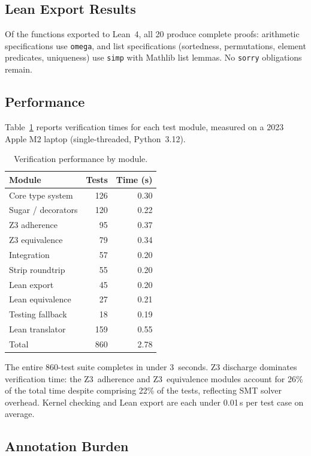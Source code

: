 \documentclass[acmsmall,nonacm,screen]{acmart}
\begin{document}
\subsection{Lean Export Results}

Of the functions exported to Lean~4, all 20 produce complete proofs:
arithmetic specifications use \texttt{omega}, and list specifications
(sortedness, permutations, element predicates, uniqueness) use
\texttt{simp} with Mathlib list lemmas.  No \texttt{sorry}
obligations remain.

\subsection{Performance}

Table~\ref{tab:perf} reports verification times for each test module,
measured on a 2023 Apple M2 laptop (single-threaded, Python~3.12).

\begin{table}[t]
\caption{Verification performance by module.}
\label{tab:perf}
\centering\small
\begin{tabular}{@{}lrr@{}}
\toprule
Module & Tests & Time (s) \\
\midrule
Core type system & 126 & 0.30 \\
Sugar / decorators & 120 & 0.22 \\
Z3 adherence & 95 & 0.37 \\
Z3 equivalence & 79 & 0.34 \\
Integration & 57 & 0.20 \\
Strip roundtrip & 55 & 0.20 \\
Lean export & 45 & 0.20 \\
Lean equivalence & 27 & 0.21 \\
Testing fallback & 18 & 0.19 \\
Lean translator & 159 & 0.55 \\
\midrule
Total & 860 & 2.78 \\
\bottomrule
\end{tabular}
\end{table}

The entire 860-test suite completes in under 3~seconds.  Z3
discharge dominates verification time: the Z3~adherence and
Z3~equivalence modules account for 26\% of the total time despite
comprising 22\% of the tests, reflecting SMT solver overhead.  Kernel
checking and Lean export are each under 0.01\,s per test case on
average.

\subsection{Annotation Burden}
\end{document}
